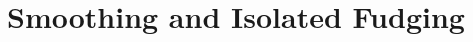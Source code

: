 \documentclass[inequalities.tex]{subfile}
\begin{document}
	\section{Smoothing and Isolated Fudging}
\end{document}
